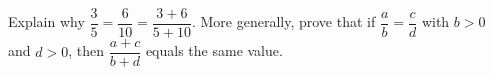 Explain why $\dfrac35=\dfrac6{10}=\dfrac{3+6}{5+10}$. More generally, prove that if $\dfrac ab=\dfrac cd$ with $b>0$ and $d>0$, then $\dfrac{a+c}{b+d}$ equals the same value.
